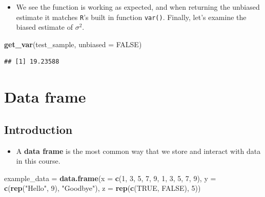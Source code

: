 \documentclass[]{book}
\newenvironment{Shaded}{\begin{snugshade}}{\end{snugshade}}
\newcommand{\KeywordTok}[1]{\textcolor[rgb]{0.13,0.29,0.53}{\textbf{#1}}}
\newcommand{\DataTypeTok}[1]{\textcolor[rgb]{0.13,0.29,0.53}{#1}}
\newcommand{\DecValTok}[1]{\textcolor[rgb]{0.00,0.00,0.81}{#1}}
\newcommand{\StringTok}[1]{\textcolor[rgb]{0.31,0.60,0.02}{#1}}
\newcommand{\OtherTok}[1]{\textcolor[rgb]{0.56,0.35,0.01}{#1}}
\newcommand{\NormalTok}[1]{#1}
\providecommand{\tightlist}{%
  \setlength{\itemsep}{0pt}\setlength{\parskip}{0pt}}
\begin{document}
\begin{itemize}
\tightlist
\item
  We see the function is working as expected, and when returning the
  unbiased estimate it matches \texttt{R}'s built in function
  \texttt{var()}. Finally, let's examine the biased estimate of
  \(\sigma^2\).
\end{itemize}

\begin{Shaded}
\begin{Highlighting}[]
\KeywordTok{get_var}\NormalTok{(test_sample, }\DataTypeTok{unbiased =} \OtherTok{FALSE}\NormalTok{)}
\end{Highlighting}
\end{Shaded}

\begin{verbatim}
## [1] 19.23588
\end{verbatim}

\chapter{Data frame}\label{data-frame}

\section{Introduction}\label{introduction}

\begin{itemize}
\tightlist
\item
  A \textbf{data frame} is the most common way that we store and
  interact with data in this course.
\end{itemize}

\begin{Shaded}
\begin{Highlighting}[]
\NormalTok{example_data =}\StringTok{ }\KeywordTok{data.frame}\NormalTok{(}\DataTypeTok{x =} \KeywordTok{c}\NormalTok{(}\DecValTok{1}\NormalTok{, }\DecValTok{3}\NormalTok{, }\DecValTok{5}\NormalTok{, }\DecValTok{7}\NormalTok{, }\DecValTok{9}\NormalTok{, }\DecValTok{1}\NormalTok{, }\DecValTok{3}\NormalTok{, }\DecValTok{5}\NormalTok{, }\DecValTok{7}\NormalTok{, }\DecValTok{9}\NormalTok{),}
                          \DataTypeTok{y =} \KeywordTok{c}\NormalTok{(}\KeywordTok{rep}\NormalTok{(}\StringTok{"Hello"}\NormalTok{, }\DecValTok{9}\NormalTok{), }\StringTok{"Goodbye"}\NormalTok{),}
                          \DataTypeTok{z =} \KeywordTok{rep}\NormalTok{(}\KeywordTok{c}\NormalTok{(}\OtherTok{TRUE}\NormalTok{, }\OtherTok{FALSE}\NormalTok{), }\DecValTok{5}\NormalTok{))}
\end{Highlighting}
\end{Shaded}
\end{document}

